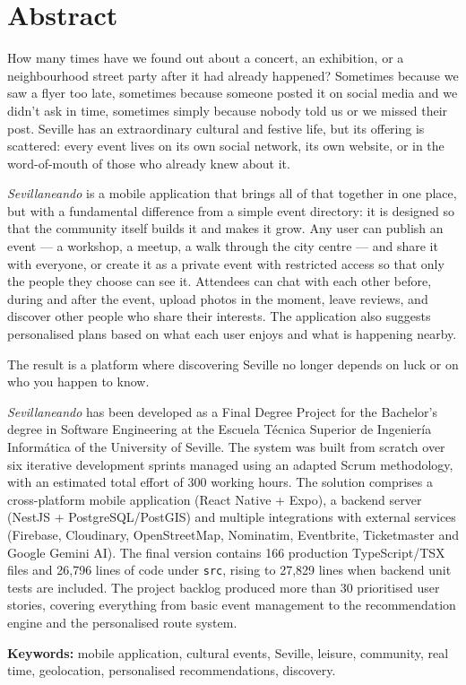 \chapter*{Abstract}
How many times have we found out about a concert, an exhibition, or a neighbourhood street party after it had already happened? Sometimes because we saw a flyer too late, sometimes because someone posted it on social media and we didn't ask in time, sometimes simply because nobody told us or we missed their post. Seville has an extraordinary cultural and festive life, but its offering is scattered: every event lives on its own social network, its own website, or in the word-of-mouth of those who already knew about it.

\textit{Sevillaneando} is a mobile application that brings all of that together in one place, but with a fundamental difference from a simple event directory: it is designed so that the community itself builds it and makes it grow. Any user can publish an event — a workshop, a meetup, a walk through the city centre — and share it with everyone, or create it as a private event with restricted access so that only the people they choose can see it. Attendees can chat with each other before, during and after the event, upload photos in the moment, leave reviews, and discover other people who share their interests. The application also suggests personalised plans based on what each user enjoys and what is happening nearby.

The result is a platform where discovering Seville no longer depends on luck or on who you happen to know.

\textit{Sevillaneando} has been developed as a Final Degree Project for the Bachelor's degree in Software Engineering at the Escuela Técnica Superior de Ingeniería Informática of the University of Seville. The system was built from scratch over six iterative development sprints managed using an adapted Scrum methodology, with an estimated total effort of 300 working hours. The solution comprises a cross-platform mobile application (React Native + Expo), a backend server (NestJS + PostgreSQL/PostGIS) and multiple integrations with external services (Firebase, Cloudinary, OpenStreetMap, Nominatim, Eventbrite, Ticketmaster and Google Gemini AI). The final version contains 166 production TypeScript/TSX files and 26,796 lines of code under \texttt{src}, rising to 27,829 lines when backend unit tests are included. The project backlog produced more than 30 prioritised user stories, covering everything from basic event management to the recommendation engine and the personalised route system.

\vspace{.5cm}

\textbf{Keywords:} mobile application, cultural events, Seville, leisure, community, real time, geolocation, personalised recommendations, discovery.
